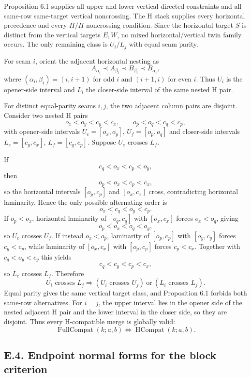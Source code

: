 \documentclass[11pt]{article}
\theoremstyle{definition}
\theoremstyle{remark}
\begin{document}
Proposition 6.1 supplies all upper and lower vertical directed
constraints and all same-row same-target vertical noncrossing. The H
stack supplies every horizontal precedence and every \(H/H\) noncrossing
condition. Since the horizontal target \(S\) is distinct from the
vertical targets \(E,W\), no mixed horizontal/vertical twin family
occurs. The only remaining class is \(U_i/L_j\) with equal seam parity.

For seam \(i\), orient the adjacent horizontal nesting as \[
A_{\alpha_i}\prec A_{\beta_i}\prec B_{\beta_i}\prec B_{\alpha_i},
\] where \((\alpha_i,\beta_i)=(i,i+1)\) for odd \(i\) and \((i+1,i)\)
for even \(i\). Thus \(U_i\) is the opener-side interval and \(L_i\) the
closer-side interval of the same nested H pair.

For distinct equal-parity seams \(i,j\), the two adjacent column pairs
are disjoint. Consider two nested H pairs \[
o_x<o_y<c_y<c_x,
\qquad
o_p<o_q<c_q<c_p,
\] with opener-side intervals \(U_e=[o_x,o_y]\), \(U_f=[o_p,o_q]\) and
closer-side intervals \(L_e=[c_y,c_x]\), \(L_f=[c_q,c_p]\). Suppose
\(U_e\) crosses \(L_f\).

If \[
c_q<o_x<c_p<o_y,
\] then \[
o_p<o_x<c_p<c_x,
\] so the horizontal intervals \([o_p,c_p]\) and \([o_x,c_x]\) cross,
contradicting horizontal laminarity. Hence the only possible alternating
order is \[
o_x<c_q<o_y<c_p.
\] If \(o_p<o_x\), horizontal laminarity of \([o_q,c_q]\) with
\([o_x,c_x]\) forces \(o_x<o_q\), giving \[
o_p<o_x<o_q<o_y,
\] so \(U_e\) crosses \(U_f\). If instead \(o_x<o_p\), laminarity of
\([o_p,c_p]\) with \([o_y,c_y]\) forces \(c_y<c_p\), while laminarity of
\([o_x,c_x]\) with \([o_p,c_p]\) forces \(c_p<c_x\). Together with
\(c_q<o_y<c_y\) this yields \[
c_q<c_y<c_p<c_x,
\] so \(L_e\) crosses \(L_f\). Therefore \[
U_i\text{ crosses }L_j
\Longrightarrow
(U_i\text{ crosses }U_j)\ \text{or}\ (L_i\text{ crosses }L_j).
\] Equal parity gives the same vertical target class, and Proposition
6.1 forbids both same-row alternatives. For \(i=j\), the upper interval
lies in the opener side of the nested adjacent H pair and the lower
interval in the closer side, so they are disjoint. Thus every
H-compatible merge is globally valid: \[
\operatorname{FullCompat}(k;a,b)
\iff
\operatorname{HCompat}(k;a,b).
\]

\subsection{E.4. Endpoint normal forms for the block
criterion}\label{e.4.-endpoint-normal-forms-for-the-block-criterion}
\end{document}
